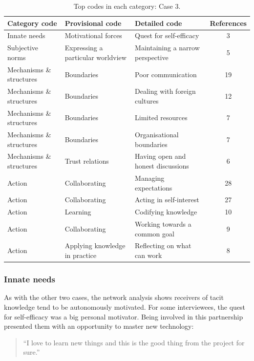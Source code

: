 \begin{table}
\centering
\caption{Top codes in each category: Case 3.}
\label{tab:case_3_codes}
\begin{tabular}{lllc}
\toprule
Category code & Provisional code & Detailed code & References \\ 
\midrule
Innate needs & Motivational forces & Quest for self-efficacy &   3 \\ 
Subjective norms & Expressing a particular worldview & Maintaining a narrow perspective &   5 \\ 
Mechanisms \& structures & Boundaries & Poor communication &  19 \\ 
Mechanisms \& structures & Boundaries & Dealing with foreign cultures &  12 \\ 
Mechanisms \& structures & Boundaries & Limited resources &   7 \\ 
Mechanisms \& structures & Boundaries & Organisational boundaries &   7 \\ 
Mechanisms \& structures & Trust relations & Having open and honest discussions &   6 \\ 
Action & Collaborating & Managing expectations &  28 \\ 
Action & Collaborating & Acting in self-interest &  27 \\ 
Action & Learning & Codifying knowledge &  10 \\ 
Action & Collaborating & Working towards a common goal &   9 \\ 
Action & Applying knowledge in practice & Reflecting on what can work &   8 \\ 
\bottomrule
\end{tabular}
\end{table}

\subsubsection{Innate needs}

As with the other two cases, the network analysis shows receivers of tacit knowledge tend to be autonomously motivated. For some interviewees, the quest for self-efficacy was a big personal motivator. Being involved in this partnership presented them with an opportunity to master new technology: 

\begin{quote}
\small
\enquote{I love to learn new things and this is the good thing from the project for sure.} \\
\end{quote}

